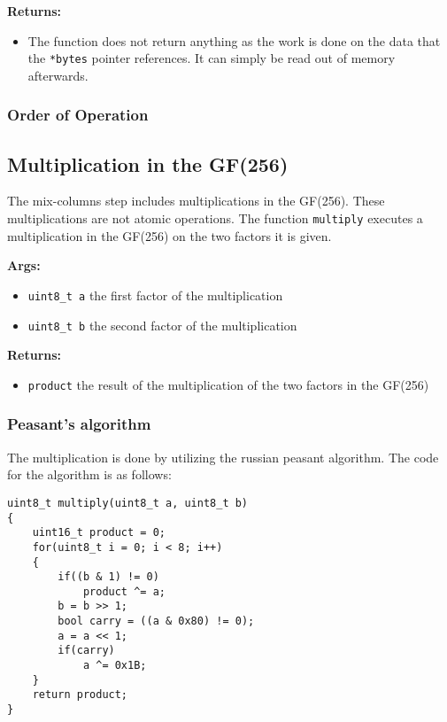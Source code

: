 \textbf{Returns:}
\begin{itemize}
  \item The function does not return anything as the work is done on the data that the \lstinline{*bytes} pointer references. It can simply be read out of memory afterwards.
\end{itemize}

\subsubsection{Order of Operation}


\subsection{Multiplication in the GF(256)}
\label{ch:dec_multiplication}
The mix-columns step includes multiplications in the GF(256). These multiplications are not atomic operations. The function \lstinline{multiply} executes a multiplication in the GF(256) on the two factors it is given.

\textbf{Args:}
\begin{itemize}
  \item \lstinline{uint8_t a} the first factor of the multiplication
  \item \lstinline{uint8_t b} the second factor of the multiplication
\end{itemize}

\textbf{Returns:}
\begin{itemize}
  \item \lstinline{product} the result of the multiplication of the two factors in the GF(256)
\end{itemize}

\subsubsection{Peasant's algorithm}
The multiplication is done by utilizing the russian peasant algorithm. The code for the algorithm is as follows:
\begin{lstlisting}
uint8_t multiply(uint8_t a, uint8_t b)
{
    uint16_t product = 0;
    for(uint8_t i = 0; i < 8; i++)
    {
        if((b & 1) != 0)
            product ^= a;
        b = b >> 1;
        bool carry = ((a & 0x80) != 0);
        a = a << 1;
        if(carry)
            a ^= 0x1B;
    }
    return product;
}
\end{lstlisting}

